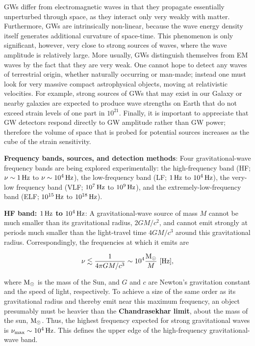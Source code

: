 \documentclass[a4paper,10pt]{article}
\begin{document}
{\noindent}GWs differ from electromagnetic waves in that they propagate essentially unperturbed through space, as they interact only very weakly with matter. Furthermore, GWs are intrinsically non-linear, because the wave energy density itself generates additional curvature of space-time. This phenomenon is only significant, however, very close to strong sources of waves, where the wave amplitude is relatively large. More usually, GWs distinguish themselves from EM waves by the fact that they are very weak. One cannot hope to detect any waves of terrestrial origin, whether naturally occurring or man-made; instead one must look for very massive compact astrophysical objects, moving at relativistic velocities. For example, strong sources of GWs that may exist in our Galaxy or nearby galaxies are expected to produce wave strengths on Earth that do not exceed strain levels of one part in $10^{21}$. Finally, it is important to appreciate that GW detectors respond directly to GW amplitude rather than GW power; therefore the volume of space that is probed for potential sources increases as the cube of the strain sensitivity.


{\noindent}\textbf{Frequency bands, sources, and detection methods}: Four gravitational-wave frequency bands are being explored experimentally: the high-frequency band (HF; $\nu\sim1\,{\rm Hz}$ to $\nu\sim10^4\,{\rm Hz}$), the low-frequency band (LF; $1\,{\rm Hz}$ to $10^4\,{\rm Hz}$), the very-low frequency band (VLF; $10^7\,{\rm Hz}$ to $10^9\,{\rm Hz}$), and the extremely-low-frequency band (ELF; $10^{15}\,{\rm Hz}$ to $10^{18}\,{\rm Hz}$).

{\noindent}\textbf{HF band: $1\,{\rm Hz}$ to $10^4\,{\rm Hz}$}: A gravitational-wave source of mass $M$ cannot be much smaller than its gravitational radius, $2GM/c^2$, and cannot emit strongly at periods much smaller than the light-travel time $4GM/c^3$ around this gravitational radius. Correspondingly, the frequencies at which it emits are

\begin{align*}
    \nu \lesssim \frac{1}{4\pi GM/c^3} \sim 10^4 \frac{\rm M_\odot}{M} ~ [{\rm Hz}],
\end{align*}

{\noindent}where ${\rm M_\odot}$ is the mass of the Sun, and $G$ and $c$ are Newton's gravitation constant and the speed of light, respectively. To achieve a size of the same order as its gravitational radius and thereby emit near this maximum frequency, an object presumably must be heavier than the \textbf{Chandrasekhar limit}, about the mass of the sun, ${\rm M_\odot}$. Thus, the highest frequency expected for strong gravitational waves is $\nu_{\rm max}\sim10^4\,{\rm Hz}$. This defines the upper edge of the high-frequency gravitational-wave band. 
\end{document}
